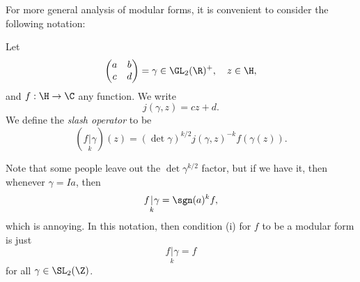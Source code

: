 \documentclass[a4paper]{article}
\begin{document}
For more general analysis of modular forms, it is convenient to consider the following notation:
\begin{defi}
  Let
  \[
    \begin{pmatrix}
      a & b\\
      c & d
    \end{pmatrix} = \gamma \in \GL_2(\R)^+,\quad z \in \H,
  \]
  and $f: \H \to \C$ any function. We write
  \[
    j(\gamma, z) = cz + d.
  \]
  We define the \emph{slash operator} to be
  \[
    (f\underset{k}{|} \gamma) (z) = (\det \gamma)^{k/2} j(\gamma, z)^{-k} f(\gamma(z)).
  \]
\end{defi}
Note that some people leave out the $\det \gamma^{k/2}$ factor, but if we have it, then whenever $\gamma = Ia$, then
\[
  f\underset{k}{|} \gamma = \sgn(a)^k f,
\]
which is annoying. In this notation, then condition (i) for $f$ to be a modular form is just
\[
  f\underset{k}{|}\gamma = f
\]
for all $\gamma \in \SL_2(\Z)$.
\end{document}
